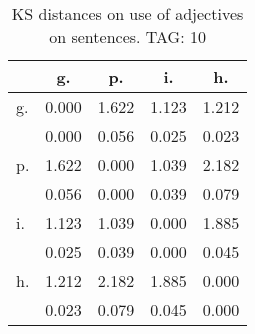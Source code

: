 \begin{table}[h!]
\begin{center}
\begin{tabular}{| l | c | c | c | c |}\hline
 & g. & p. & i. & h. \\\hline
g. & 0.000  & 1.622  & 1.123  & 1.212 \\\hline
 & 0.000  & 0.056  & 0.025  & 0.023 \\\hline
p. & 1.622  & 0.000  & 1.039  & 2.182 \\\hline
 & 0.056  & 0.000  & 0.039  & 0.079 \\\hline
i. & 1.123  & 1.039  & 0.000  & 1.885 \\\hline
 & 0.025  & 0.039  & 0.000  & 0.045 \\\hline
h. & 1.212  & 2.182  & 1.885  & 0.000 \\\hline
 & 0.023  & 0.079  & 0.045  & 0.000 \\\hline
\end{tabular}
\caption{KS distances on use of adjectives on sentences. TAG: 10}
\end{center}
\end{table}